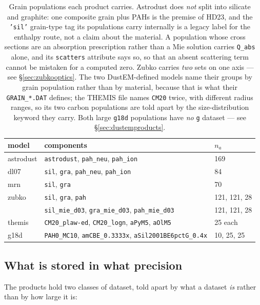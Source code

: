 \documentclass{my_memo}
\newcommand{\code}[1]{\texttt{#1}}
\begin{document}
\begin{table}[h]
\centering
\begin{tabular}{@{}lll@{}}
\toprule
model & components & $n_a$ \\
\midrule
astrodust & \code{astrodust}, \code{pah\_neu}, \code{pah\_ion} & 169 \\
dl07      & \code{sil}, \code{gra}, \code{pah\_neu}, \code{pah\_ion} & 84 \\
mrn       & \code{sil}, \code{gra} & 70 \\
zubko     & \code{sil}, \code{gra}, \code{pah} & 121, 121, 28 \\
          & \code{sil\_mie\_d03}, \code{gra\_mie\_d03}, \code{pah\_mie\_d03} & 121, 121, 28 \\
themis    & \code{CM20\_plaw-ed}, \code{CM20\_logn}, \code{aPyM5}, \code{aOlM5} & 25 each \\
g18d      & \code{PAH0\_MC10}, \code{amCBE\_0.3333x}, \code{aSil2001BE6pctG\_0.4x} & 10, 25, 25 \\
\bottomrule
\end{tabular}
\caption{Grain populations each product carries. Astrodust does \emph{not}
split into silicate and graphite: one composite grain plus PAHs is the premise
of HD23, and the \code{'sil'} grain-type tag its populations carry internally is
a legacy label for the enthalpy route, not a claim about the material. A
population whose cross sections are an absorption prescription rather than a Mie
solution carries \code{Q\_abs} alone, and its \code{scatters} attribute says
so, so that an absent scattering term cannot be mistaken for a computed zero.
Zubko carries \emph{two} sets on one axis --- see \S\ref{sec:zubkooptics}.
The two DustEM-defined models name their groups by grain population rather than
by material, because that is what their \code{GRAIN\_*.DAT} defines; the THEMIS
file names \code{CM20} twice, with different radius ranges, so its two carbon
populations are told apart by the size-distribution keyword they carry. Both
large \code{g18d} populations have \emph{no} \code{g} dataset --- see
\S\ref{sec:dustemproducts}.}
\label{tab:h5comp}
\end{table}

\subsection{What is stored in what precision}\label{sec:h5precision}

The products hold two classes of dataset, told apart by what a dataset
\emph{is} rather than by how large it is:
\end{document}
